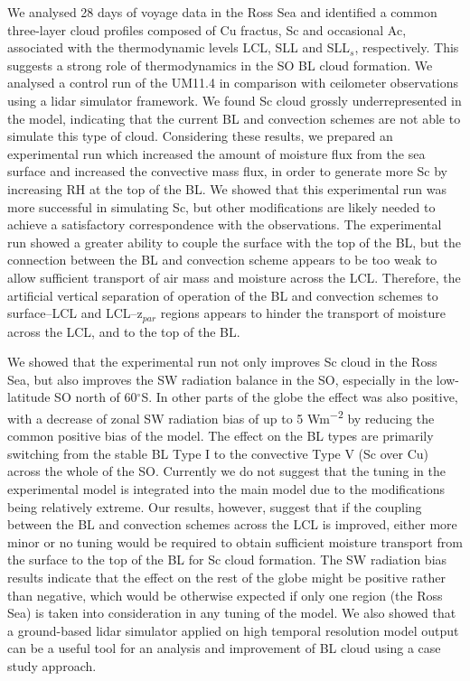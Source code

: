 We analysed 28 days of voyage data in the Ross Sea and identified a common
three-layer cloud profiles composed of Cu fractus, Sc and occasional
Ac, associated with the thermodynamic levels LCL, SLL and SLL$_s$, respectively.
This suggests a strong role of thermodynamics in the SO BL cloud formation.
We analysed a control run of the UM11.4 in comparison with ceilometer
observations using a lidar simulator framework. We found Sc cloud grossly
underrepresented in the model, indicating that the current BL and convection
schemes are not able to simulate this type of cloud. Considering these results,
we prepared an experimental run which increased the amount of moisture flux
from the sea surface and increased the convective mass flux, in order to
generate more Sc by increasing RH at the top of the BL. We showed that this
experimental run was more successful in simulating Sc, but other
modifications are likely needed to achieve a satisfactory correspondence with
the observations. The experimental run showed a greater ability to couple the
surface with the top of the BL, but the connection between the BL and convection
scheme appears to be too weak to allow sufficient transport of air mass and
moisture across the LCL. Therefore, the artificial vertical separation of operation of the
BL and convection schemes to surface--LCL and LCL--z$_{par}$ regions appears
to hinder the transport of moisture across the LCL, and to the top of the BL.

We showed that the experimental run not only improves Sc cloud in the Ross Sea,
but also improves the SW radiation balance in the SO, especially in the
low-latitude SO north of 60$^\circ$S. In other parts of the globe the effect was
also positive, with a decrease of zonal SW radiation bias of up to 5
\unit{Wm^{-2}} by reducing the common positive bias of the model. The
effect on the BL types are primarily switching from the stable BL Type I
to the convective Type V (Sc over Cu) across the whole of the SO. %
Currently we do not suggest that the tuning in the experimental model is
integrated into the main model due to the modifications being relatively
extreme. Our results, however, suggest that if the
coupling between the BL and convection schemes across the LCL is improved,
either more minor or no tuning would be required to obtain sufficient moisture
transport from the surface to the top of the BL for Sc cloud formation.
The SW radiation bias results indicate that the effect on the rest of the
globe might be positive rather than negative, which would be otherwise
expected if only one region (the Ross Sea) is taken into consideration in any
tuning of the model. We also showed that a ground-based lidar simulator
applied on high temporal resolution model output can be a useful tool for an
analysis and improvement of BL cloud using a case study approach.

